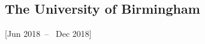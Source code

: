 \documentclass{mycv}
\begin{document}




\subsection{The University of Birmingham}[Jun 2018~--~ Dec 2018]

\end{document}
